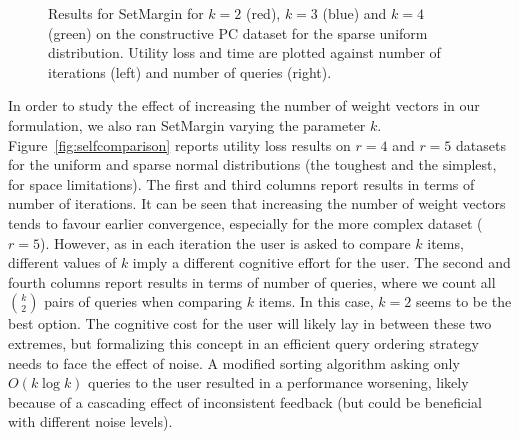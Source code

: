 \documentclass{article}
\renewcommand\[{\begin{equation}}
\renewcommand\]{\end{equation}}
\begin{document}
\begin{figure}
{\begin{tabular}{lcccc}
        \\
    \end{tabular}
    }
    \caption{\label{fig:pc} Results for {\sc SetMargin} for $k=2$
      (red), $k=3$ (blue) and $k=4$ (green) on the constructive PC
      dataset for the sparse uniform distribution. Utility loss and
      time are plotted against number of iterations (left)
      and number of queries (right).}
\end{figure}


In order to study the effect of increasing the number of weight
vectors in our formulation, we also ran {\sc SetMargin} varying the
parameter $k$. Figure~\ref{fig:selfcomparison} reports utility loss
results on $r=4$ and $r=5$ datasets for the uniform and sparse normal
distributions (the toughest and the simplest, for space limitations).
The first and third columns report results in terms of number of
iterations. It can be seen that increasing the number of weight
vectors tends to favour earlier convergence, especially for the more
complex dataset ($r=5$). However, as in each iteration the user is
asked to compare $k$ items, different values of $k$ imply a different
cognitive effort for the user. The second and fourth columns report
results in terms of number of queries, where we count all
$k \choose 2$ pairs of queries when comparing $k$ items. In this case,
$k=2$ seems to be the best option. The cognitive cost for the user
will likely lay in between these two extremes, but formalizing this
concept in an efficient query ordering strategy needs to face the
effect of noise.  A modified sorting algorithm asking only
$O(k\log k)$ queries to the user resulted in a performance worsening,
likely because of a cascading effect of inconsistent feedback (but
could be beneficial with different noise levels).
\end{document}
